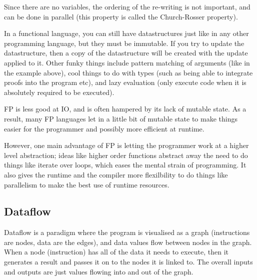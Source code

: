 Since there are no variables, the ordering of the re-writing is not
important, and can be done in parallel (this property is called the
Church-Rosser property).

In a functional language, you can still have datastructures just like
in any other programming language, but they must be immutable. If you
try to update the datastructure, then a copy of the datastructure will
be created with the update applied to it. Other funky things include
pattern matching of arguments (like in the example above), cool things
to do with types (such as being able to integrate proofs into the
program etc), and lazy evaluation (only execute code when it is
absolutely required to be executed).

FP is less good at IO, and is often hampered by its lack of mutable
state. As a result, many FP languages let in a little bit of mutable
state to make things easier for the programmer and possibly more
efficient at runtime.

However, one main advantage of FP is letting the programmer work at a
higher level abstraction; ideas like higher order functions abstract
away the need to do things like iterate over loops, which eases the
mental strain of programming. It also gives the runtime and the
compiler more flexilbility to do things like parallelism to make the
best use of runtime resources.

\subsection{Dataflow}

Dataflow is a paradigm where the program is visualised as a graph
(instructions are nodes, data are the edges), and data values flow
between nodes in the graph. When a node (instruction) has all of the
data it needs to execute, then it generates a result and passes it on
to the nodes it is linked to. The overall inputs and outputs are just
values flowing into and out of the graph.

